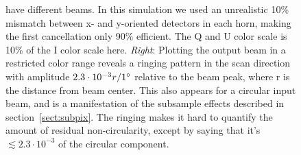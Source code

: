 \documentclass{article}
\begin{document}
\begin{figure}
{	have different beams. In this simulation we used an unrealistic
	10\% mismatch between x- and y-oriented detectors in each horn, making
	the first cancellation only 90\% efficient. The Q and U color scale is
	10\% of the I color scale here. \emph{Right}: Plotting the output beam in
	a restricted color range reveals a ringing pattern in the scan direction
	with amplitude $2.3\cdot
	10^{-3} r/1\degree$ relative to the beam peak,
	where r is the distance from beam center. This also appears
	for a circular input beam, and is a manifestation of the subsample effects
	described in section~\ref{sect:subpix}. The ringing makes it hard to
	quantify the amount of residual non-circularity, except by saying that it's
	$\lesssim 2.3\cdot 10^{-3}$ of the circular component.}
	\label{fig:src_leak}
\end{figure}
\end{document}
